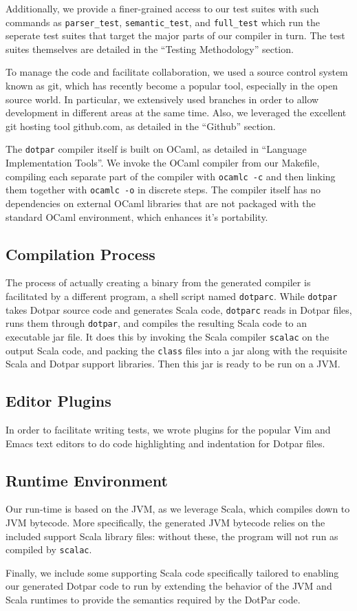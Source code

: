 Additionally, we provide a finer-grained access to our test suites
with such commands as \texttt{parser\_test}, \texttt{semantic\_test},
and \texttt{full\_test} which run the seperate test suites that target
the major parts of our compiler in turn. The test suites themselves
are detailed in the ``Testing Methodology'' section.

To manage the code and facilitate collaboration, we used a source
control system known as git, which has recently become a popular tool,
especially in the open source world. In particular, we extensively
used branches in order to allow development in different areas at the
same time. Also, we leveraged the excellent git hosting tool
github.com, as detailed in the ``Github'' section.

The \texttt{dotpar} compiler itself is built on OCaml, as detailed in
``Language Implementation Tools''. We invoke the OCaml compiler from
our Makefile, compiling each separate part of the compiler with
\texttt{ocamlc -c} and then linking them together with \texttt{ocamlc
  -o} in discrete steps. The compiler itself has no dependencies on
external OCaml libraries that are not packaged with the standard OCaml
environment, which enhances it's portability.

\subsection{Compilation Process}

The process of actually creating a binary from the generated compiler
is facilitated by a different program, a shell script named
\texttt{dotparc}. While \texttt{dotpar} takes Dotpar source code and
generates Scala code, \texttt{dotparc} reads in Dotpar files, runs
them through \texttt{dotpar}, and compiles the resulting Scala code to
an executable jar file. It does this by invoking the Scala compiler
\texttt{scalac} on the output Scala code, and packing the
\texttt{class} files into a jar along with the requisite Scala and
Dotpar support libraries. Then this jar is ready to be run on a JVM.

\subsection{Editor Plugins}

In order to facilitate writing tests, we wrote plugins for the popular
Vim and Emacs text editors to do code highlighting and indentation for
Dotpar files.

\subsection{Runtime Environment}

Our run-time is based on the JVM, as we leverage Scala, which compiles
down to JVM bytecode. More specifically, the generated JVM bytecode
relies on the included support Scala library files: without these, the
program will not run as compiled by \texttt{scalac}.

Finally, we include some supporting Scala code specifically tailored
to enabling our generated Dotpar code to run by extending the behavior
of the JVM and Scala runtimes to provide the semantics required by the
DotPar code.
